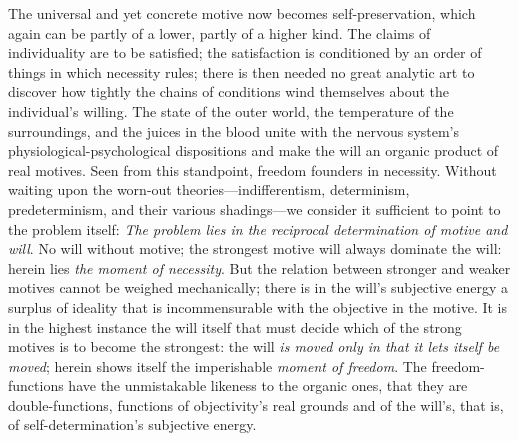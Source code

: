 \documentclass[12pt]{article}
\begin{document}
The universal and yet concrete motive now becomes self-preservation, which
again can be partly of a lower, partly of a higher kind. The claims of
individuality are to be satisfied; the satisfaction is conditioned by an
order of things in which necessity rules; there is then needed no great
analytic art to discover how
tightly the chains of conditions wind themselves about the individual's
willing. The state of the outer world, the temperature of the surroundings,
and the juices in the blood unite with the nervous system's
physiological-psychological dispositions and make the will an organic product
of real motives. Seen from this standpoint, freedom founders in necessity.
Without waiting upon the worn-out theories—indifferentism, determinism,
predeterminism, and their various shadings—we consider it sufficient to point
to the problem itself: \emph{The problem lies in the reciprocal determination
of motive and will}. No will without motive; the strongest motive will always
dominate the will: herein lies \emph{the moment of necessity}. But the
relation between stronger and weaker motives cannot be weighed mechanically;
there is in the will's subjective energy a surplus of ideality that is
incommensurable with the objective in the motive. It is in the highest
instance the will itself that must decide which of the strong motives is to
become the strongest: the will \emph{is moved only in that it lets itself be
moved}; herein shows itself the imperishable \emph{moment of freedom}. The
freedom-functions have the unmistakable likeness to the organic ones, that
they are double-functions, functions of objectivity's real grounds and of the
will's, that is, of self-determination's subjective energy.
\end{document}
